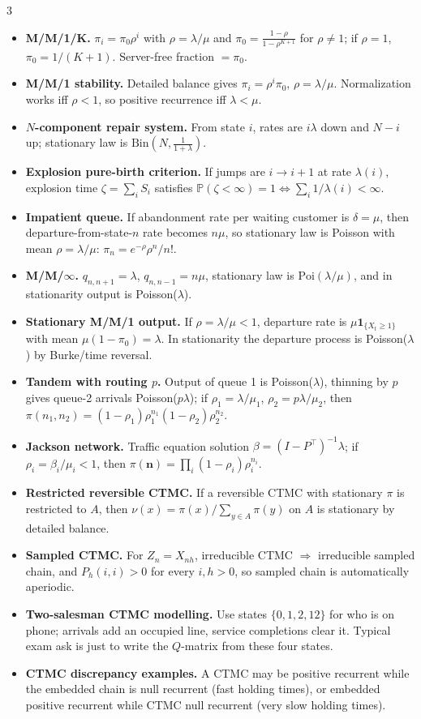 \documentclass[8pt]{extarticle}
\newcommand{\PP}{\mathbb{P}}
\newcommand{\1}{\mathbf{1}}
\begin{document}
\begin{multicols*}{3}
\begin{itemize}
\item \textbf{M/M/1/K.} $\pi_i=\pi_0\rho^i$ with $\rho=\lambda/\mu$ and
$\pi_0=\frac{1-\rho}{1-\rho^{K+1}}$ for $\rho\neq1$; if $\rho=1$, $\pi_0=1/(K+1)$. Server-free fraction $=\pi_0$.
\item \textbf{M/M/1 stability.} Detailed balance gives $\pi_i=\rho^i\pi_0$, $\rho=\lambda/\mu$. Normalization works iff $\rho<1$, so positive recurrence iff $\lambda<\mu$.
\item \textbf{$N$-component repair system.} From state $i$, rates are $i\lambda$ down and $N-i$ up; stationary law is $\mathrm{Bin}\!\left(N,\frac1{1+\lambda}\right)$.
\item \textbf{Explosion pure-birth criterion.} If jumps are $i\to i+1$ at rate $\lambda(i)$, explosion time $\zeta=\sum_i S_i$ satisfies $\PP(\zeta<\infty)=1\iff \sum_i1/\lambda(i)<\infty$.
\item \textbf{Impatient queue.} If abandonment rate per waiting customer is $\delta=\mu$, then departure-from-state-$n$ rate becomes $n\mu$, so stationary law is Poisson with mean $\rho=\lambda/\mu$: $\pi_n=e^{-\rho}\rho^n/n!$.
\item \textbf{M/M/$\infty$.} $q_{n,n+1}=\lambda$, $q_{n,n-1}=n\mu$, stationary law is $\mathrm{Poi}(\lambda/\mu)$, and in stationarity output is Poisson($\lambda$).
\item \textbf{Stationary M/M/1 output.} If $\rho=\lambda/\mu<1$, departure rate is $\mu\1_{\{X_t\ge1\}}$ with mean $\mu(1-\pi_0)=\lambda$. In stationarity the departure process is Poisson($\lambda$) by Burke/time reversal.
\item \textbf{Tandem with routing $p$.} Output of queue 1 is Poisson($\lambda$), thinning by $p$ gives queue-2 arrivals Poisson($p\lambda$); if $\rho_1=\lambda/\mu_1$, $\rho_2=p\lambda/\mu_2$, then $\pi(n_1,n_2)=(1-\rho_1)\rho_1^{n_1}(1-\rho_2)\rho_2^{n_2}$.
\item \textbf{Jackson network.} Traffic equation solution $\beta=(I-P^\top)^{-1}\lambda$; if $\rho_i=\beta_i/\mu_i<1$, then $\pi(\mathbf n)=\prod_i(1-\rho_i)\rho_i^{n_i}$.
\item \textbf{Restricted reversible CTMC.} If a reversible CTMC with stationary $\pi$ is restricted to $A$, then $\nu(x)=\pi(x)/\sum_{y\in A}\pi(y)$ on $A$ is stationary by detailed balance.
\item \textbf{Sampled CTMC.} For $Z_n=X_{nh}$, irreducible CTMC $\Rightarrow$ irreducible sampled chain, and $P_h(i,i)>0$ for every $i,h>0$, so sampled chain is automatically aperiodic.
\item \textbf{Two-salesman CTMC modelling.} Use states $\{0,1,2,12\}$ for who is on phone; arrivals add an occupied line, service completions clear it. Typical exam ask is just to write the $Q$-matrix from these four states.
\item \textbf{CTMC discrepancy examples.} A CTMC may be positive recurrent while the embedded chain is null recurrent (fast holding times), or embedded positive recurrent while CTMC null recurrent (very slow holding times).
\end{itemize}


\end{multicols*}
\end{document}
